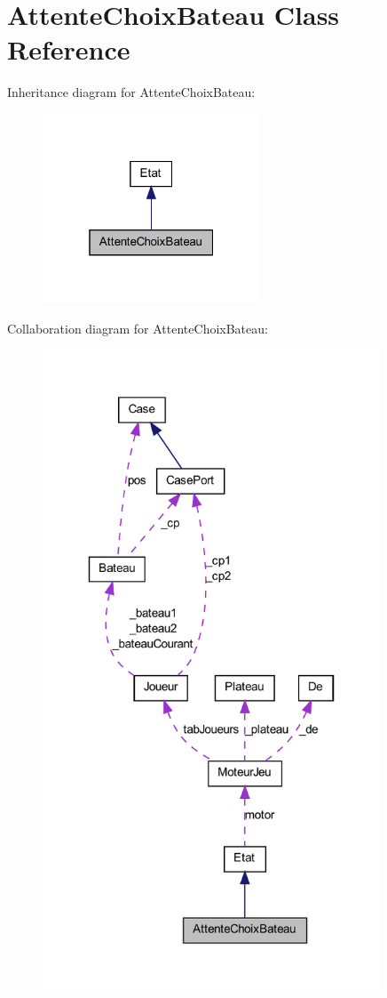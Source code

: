 \hypertarget{class_attente_choix_bateau}{
\section{AttenteChoixBateau Class Reference}
\label{class_attente_choix_bateau}
}


Inheritance diagram for AttenteChoixBateau:
\nopagebreak
\begin{figure}[H]
\begin{center}
\leavevmode
\includegraphics[width=184pt]{class_attente_choix_bateau__inherit__graph}
\end{center}
\end{figure}


Collaboration diagram for AttenteChoixBateau:
\nopagebreak
\begin{figure}[H]
\begin{center}
\leavevmode
\includegraphics[width=285pt]{class_attente_choix_bateau__coll__graph}
\end{center}
\end{figure}

